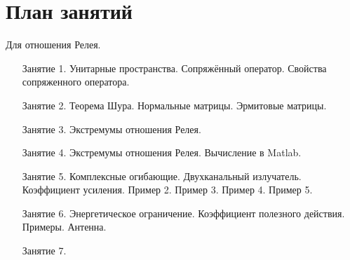 \chapter{План занятий}

Для отношения Релея.
\begin{itemize}
    \item[Занятие 1.] Унитарные пространства. Сопряжённый оператор. Свойства сопряженного оператора.
    \item[Занятие 2.] Теорема Шура. Нормальные матрицы. Эрмитовые матрицы.
    \item[Занятие 3.] Экстремумы отношения Релея.
    \item[Занятие 4.] Экстремумы отношения Релея. Вычисление в Matlab.
    \item[Занятие 5.] Комплексные огибающие. Двухканальный излучатель. Коэффициент усиления. Пример 2. Пример 3. Пример 4. Пример 5.
    \item[Занятие 6.] Энергетическое ограничение. Коэффициент полезного действия. Примеры. Антенна.
    \item[Занятие 7.] 
\end{itemize}